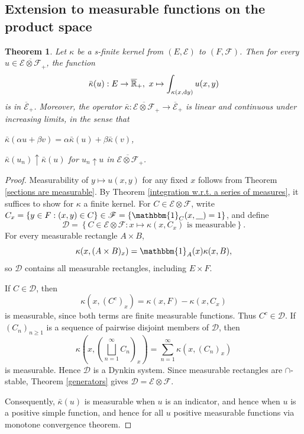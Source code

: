 \documentclass[11pt, a4paper, openany]{book}
\newtheorem{thm}{Theorem}\newtheorem{lem}{Lemma}\newtheorem{crl}{Corollary}
\theoremstyle{definition}
\newcommand{\ph}{\underline{\hspace{0.3cm}}}
\newcommand{\er}{\overline{\mathbb{R}}}
\newenvironment{tight_enumerate}{\begin{enumerate}\itemsep -0.2em}{\end{enumerate}}
\begin{document}
\subsection{Extension to measurable functions on the product space}
    \begin{thm}\label{Extension to measurable functions on the product space}
        Let $\kappa$ be a s-finite kernel from $(E,\mathscr{E})$ to $(F,\mathscr{F})$. Then for every $u\in \overline{\mathscr{E}\otimes\mathscr{F}}_+$, the function
        \[
            \bar{\kappa}(u):E\rightarrow\er_+,\,\,x\mapsto \int_{\kappa(x,\odif y)}u(x,y)
        \]
        is in $\overline{\mathscr{E}}_+$. Moreover, the operator $\bar{\kappa}:\overline{\mathscr{E}\otimes\mathscr{F}}_+\rightarrow \overline{\mathscr{E}}_+$ is linear and continuous under increasing limits, in the sense that
        \begin{tight_enumerate}
            \item $\bar{\kappa}(\alpha u+\beta v)=\alpha\bar{\kappa}(u)+\beta\bar{\kappa}(v)$,
            \item $\bar{\kappa}(u_n)\uparrow \bar{\kappa}(u)$ for $u_n\uparrow u$ in $\overline{\mathscr{E}\otimes\mathscr{F}}_+$.
        \end{tight_enumerate}
    \end{thm}
    \begin{proof}
        Measurability of $y\mapsto u(x,y)$ for any fixed $x$ follows from Theorem \ref{sections are measurable}.
        By Theorem \ref{integration w.r.t. a series of measures}, it suffices to show for $\kappa$ a finite kernel.
        For $C\in\mathscr{E}\otimes\mathscr{F}$, write
        $C_x=\{y\in F:(x,y)\in C\}\in\mathscr{F}=\{\mathbbm{1}_{C}(x,\ph)=1\}$, and define
        \[
        \mathscr{D}
        =\left\{C\in\mathscr{E}\otimes\mathscr{F}:
        x\mapsto\kappa(x,C_x)\text{ is measurable}\right\}.
        \]
        For every measurable rectangle $A\times B$,
        \[
        \kappa(x,(A\times B)_x)
        =\mathbbm{1}_A(x)\kappa(x,B),
        \]
        so $\mathscr{D}$ contains all measurable rectangles, including
        $E\times F$.
        
        If $C\in\mathscr{D}$, then
        \[
        \kappa(x,(C^c)_x)
        =\kappa(x,F)-\kappa(x,C_x)
        \]
        is measurable, since both terms are finite measurable functions.
        Thus $C^c\in\mathscr{D}$.
        If $(C_n)_{n\geqslant1}$ is a sequence of pairwise disjoint
        members of $\mathscr{D}$, then
        \[
        \kappa\left(x,\left(\bigsqcup_{n=1}^{\infty}C_n\right)_x\right)
        =\sum_{n=1}^{\infty}\kappa(x,(C_n)_x)
        \]
        is measurable. Hence $\mathscr{D}$ is a Dynkin system.
        Since measurable rectangles are $\cap$-stable, Theorem \ref{generators} gives $\mathscr{D}=\mathscr{E}\otimes\mathscr{F}$.
        
        Consequently, $\bar{\kappa}(u)$ is measurable when $u$ is
        an indicator, and hence when $u$ is a positive simple
        function, and hence for all $u$ positive measurable functions via monotone convergence theorem.
    \end{proof}
\end{document}

